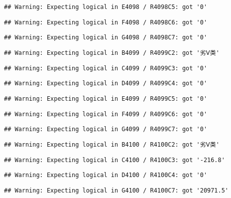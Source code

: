 \documentclass[
]{article}
\begin{document}
\begin{verbatim}
## Warning: Expecting logical in E4098 / R4098C5: got '0'
\end{verbatim}

\begin{verbatim}
## Warning: Expecting logical in F4098 / R4098C6: got '0'
\end{verbatim}

\begin{verbatim}
## Warning: Expecting logical in G4098 / R4098C7: got '0'
\end{verbatim}

\begin{verbatim}
## Warning: Expecting logical in B4099 / R4099C2: got '劣Ⅴ类'
\end{verbatim}

\begin{verbatim}
## Warning: Expecting logical in C4099 / R4099C3: got '0'
\end{verbatim}

\begin{verbatim}
## Warning: Expecting logical in D4099 / R4099C4: got '0'
\end{verbatim}

\begin{verbatim}
## Warning: Expecting logical in E4099 / R4099C5: got '0'
\end{verbatim}

\begin{verbatim}
## Warning: Expecting logical in F4099 / R4099C6: got '0'
\end{verbatim}

\begin{verbatim}
## Warning: Expecting logical in G4099 / R4099C7: got '0'
\end{verbatim}

\begin{verbatim}
## Warning: Expecting logical in B4100 / R4100C2: got '劣Ⅴ类'
\end{verbatim}

\begin{verbatim}
## Warning: Expecting logical in C4100 / R4100C3: got '-216.8'
\end{verbatim}

\begin{verbatim}
## Warning: Expecting logical in D4100 / R4100C4: got '0'
\end{verbatim}

\begin{verbatim}
## Warning: Expecting logical in G4100 / R4100C7: got '20971.5'
\end{verbatim}
\end{document}
